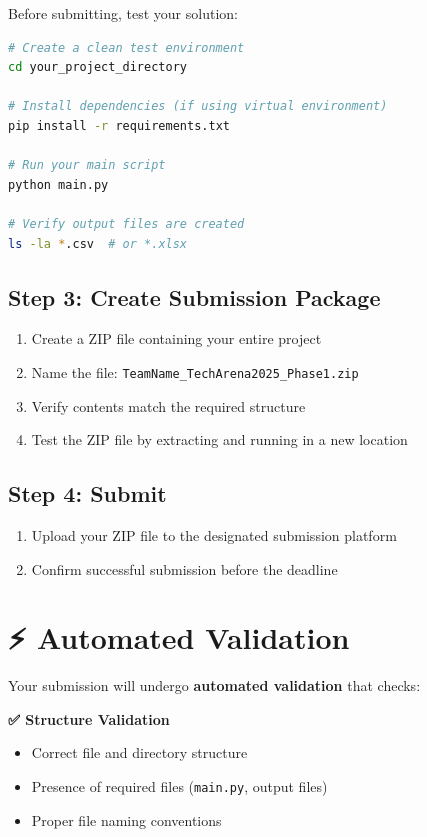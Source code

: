 \documentclass[11pt,a4paper]{article}
\begin{document}
Before submitting, test your solution:

\begin{lstlisting}[language=bash, caption=Testing Commands]
# Create a clean test environment
cd your_project_directory

# Install dependencies (if using virtual environment)
pip install -r requirements.txt

# Run your main script
python main.py

# Verify output files are created
ls -la *.csv  # or *.xlsx
\end{lstlisting}

\subsection*{Step 3: Create Submission Package}

\begin{enumerate}
    \item Create a ZIP file containing your entire project
    \item Name the file: \texttt{TeamName\_TechArena2025\_Phase1.zip}
    \item Verify contents match the required structure
    \item Test the ZIP file by extracting and running in a new location
\end{enumerate}

\subsection*{Step 4: Submit}

\begin{enumerate}
    \item Upload your ZIP file to the designated submission platform
    \item Confirm successful submission before the deadline
\end{enumerate}

\section*{⚡ Automated Validation}

Your submission will undergo \textbf{automated validation} that checks:

\textbf{✅ Structure Validation}
\begin{itemize}
    \item Correct file and directory structure
    \item Presence of required files (\texttt{main.py}, output files)
    \item Proper file naming conventions
\end{itemize}
\end{document}
